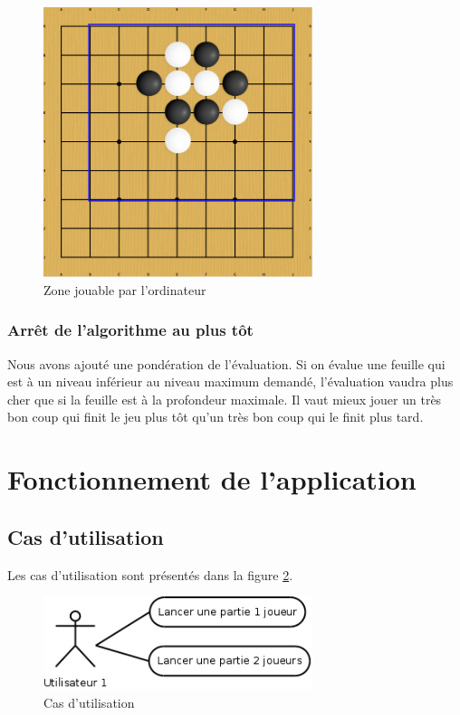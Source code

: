 \documentclass[11pt,a4paper,titlepage,french]{article}
\begin{document}
				\begin{figure}[hbt]
					\begin{center}
						\includegraphics[width=0.7\textwidth]{./rectangle-test.png}
					\end{center}
					\caption{Zone jouable par l'ordinateur}
					\label{rectangletest}
				\end{figure}


			\subsubsection{Arrêt de l'algorithme au plus tôt}
				Nous avons ajouté une pondération de l'évaluation. Si on évalue une feuille qui est à un niveau inférieur au niveau maximum demandé, l'évaluation vaudra plus cher que si la feuille est à la profondeur maximale. Il vaut mieux jouer un très bon coup qui finit le jeu plus tôt qu'un très bon coup qui le finit plus tard.


	\section{Fonctionnement de l'application}

		\subsection{Cas d'utilisation}
			Les cas d'utilisation sont présentés dans la figure \ref{use case}.

			\begin{figure}[ohbt]
				\begin{center}
					\includegraphics[width=0.7\textwidth]{./usecase.png}
				\end{center}
				\caption{Cas d'utilisation}
				\label{use case}
			\end{figure}
\end{document}
